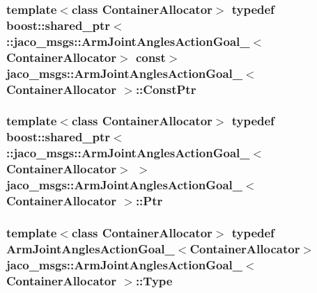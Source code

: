 \subsubsection[{\texorpdfstring{Const\+Ptr}{ConstPtr}}]{\setlength{\rightskip}{0pt plus 5cm}template$<$class Container\+Allocator$>$ typedef boost\+::shared\+\_\+ptr$<$ \+::{\bf jaco\+\_\+msgs\+::\+Arm\+Joint\+Angles\+Action\+Goal\+\_\+}$<$Container\+Allocator$>$ const$>$ {\bf jaco\+\_\+msgs\+::\+Arm\+Joint\+Angles\+Action\+Goal\+\_\+}$<$ Container\+Allocator $>$\+::{\bf Const\+Ptr}}\hypertarget{structjaco__msgs_1_1ArmJointAnglesActionGoal___affcfb0c481ae59a0e5248baa9eeb732c}{}\label{structjaco__msgs_1_1ArmJointAnglesActionGoal___affcfb0c481ae59a0e5248baa9eeb732c}
\subsubsection[{\texorpdfstring{Ptr}{Ptr}}]{\setlength{\rightskip}{0pt plus 5cm}template$<$class Container\+Allocator$>$ typedef boost\+::shared\+\_\+ptr$<$ \+::{\bf jaco\+\_\+msgs\+::\+Arm\+Joint\+Angles\+Action\+Goal\+\_\+}$<$Container\+Allocator$>$ $>$ {\bf jaco\+\_\+msgs\+::\+Arm\+Joint\+Angles\+Action\+Goal\+\_\+}$<$ Container\+Allocator $>$\+::{\bf Ptr}}\hypertarget{structjaco__msgs_1_1ArmJointAnglesActionGoal___addabada996cc8b4897c127b45dfe0ea3}{}\label{structjaco__msgs_1_1ArmJointAnglesActionGoal___addabada996cc8b4897c127b45dfe0ea3}
\subsubsection[{\texorpdfstring{Type}{Type}}]{\setlength{\rightskip}{0pt plus 5cm}template$<$class Container\+Allocator$>$ typedef {\bf Arm\+Joint\+Angles\+Action\+Goal\+\_\+}$<$Container\+Allocator$>$ {\bf jaco\+\_\+msgs\+::\+Arm\+Joint\+Angles\+Action\+Goal\+\_\+}$<$ Container\+Allocator $>$\+::{\bf Type}}\hypertarget{structjaco__msgs_1_1ArmJointAnglesActionGoal___abf48ee58a18a9c1669c62c0701f3cce3}{}\label{structjaco__msgs_1_1ArmJointAnglesActionGoal___abf48ee58a18a9c1669c62c0701f3cce3}


